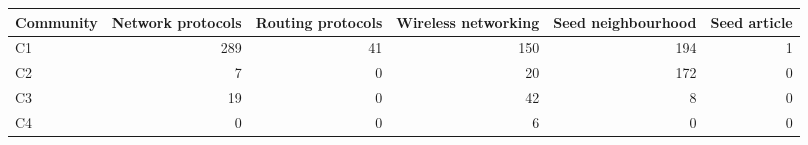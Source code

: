 
\begin{tabular}{lrrrrr}
\toprule
Community & Network protocols & Routing protocols & Wireless networking & Seed neighbourhood & Seed article\\
\midrule
C1 & 289 & 41 & 150 & 194 & 1\\
C2 & 7 & 0 & 20 & 172 & 0\\
C3 & 19 & 0 & 42 & 8 & 0\\
C4 & 0 & 0 & 6 & 0 & 0\\
\bottomrule
\end{tabular}
